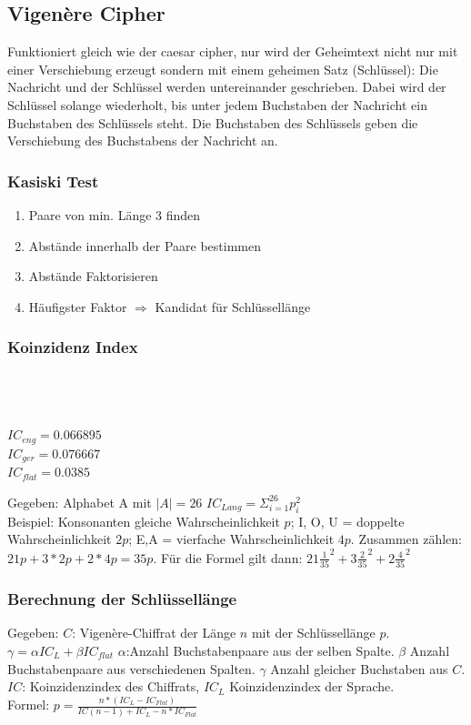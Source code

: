 \documentclass[10pt]{article}
\begin{document}
\subsection{Vigenère Cipher}
Funktioniert gleich wie der caesar cipher, nur wird der Geheimtext nicht nur mit einer Verschiebung erzeugt sondern mit einem geheimen Satz (Schlüssel): Die Nachricht und der Schlüssel werden untereinander geschrieben. Dabei wird der Schlüssel solange wiederholt, bis unter jedem Buchstaben der Nachricht ein Buchstaben des Schlüssels steht. Die Buchstaben des Schlüssels geben die Verschiebung des Buchstabens der Nachricht an.
\subsubsection{Kasiski Test}
\begin{multicols}{2}
\begin{enumerate}
\item Paare von min. Länge 3 finden
\item Abstände innerhalb der Paare bestimmen
\item Abstände Faktorisieren
\item Häufigster Faktor $\Rightarrow$ Kandidat für Schlüssellänge
\end{enumerate}
\end{multicols}
\subsubsection{Koinzidenz Index}
\begin{multicols}{2}
 \\ \\
 \\
$IC_{eng} = 0.066895$\\
$IC_{ger} = 0.076667$\\
$IC_{flat}=0.0385$\\
\end{multicols}
Gegeben: Alphabet A mit $|A|=26$ $IC_{Lang} = \Sigma_{i=1}^{26} p_i^2$ \\
Beispiel: Konsonanten gleiche Wahrscheinlichkeit $p$; I, O, U = doppelte Wahrscheinlichkeit $2p$; E,A = vierfache Wahrscheinlichkeit $4p$. Zusammen zählen: $21p + 3*2p + 2*4p = 35p$. Für die Formel gilt dann: $21\frac{1}{35}^2 + 3\frac{2}{35}^2 + 2\frac{4}{35}^2$
\subsubsection{Berechnung der Schlüssellänge}
Gegeben: $C$: Vigenère-Chiffrat der Länge $n$ mit der Schlüssellänge $p$.
$\gamma = \alpha IC_L + \beta IC_{flat}$ $\alpha$:Anzahl Buchstabenpaare aus der selben Spalte. $\beta$ Anzahl Buchstabenpaare aus verschiedenen Spalten. $\gamma$ Anzahl gleicher Buchstaben aus $C$. $IC$: Koinzidenzindex des Chiffrats, $IC_L$ Koinzidenzindex der Sprache.\\
Formel: $p = \frac{n * (IC_L - IC_{Flat})}{IC(n-1) + IC_L - n*IC_{Flat}}$
\end{document}

